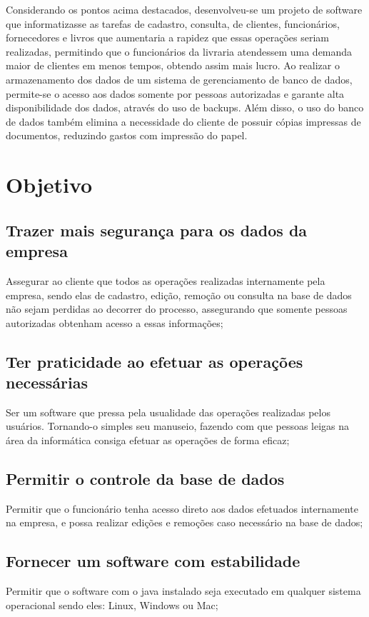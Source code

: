 Considerando os pontos acima destacados, desenvolveu-se um projeto de software que informatizasse as tarefas de cadastro, consulta, de clientes, funcionários, fornecedores e livros que aumentaria a rapidez que essas operações seriam realizadas, permitindo que o funcionários da livraria atendessem uma demanda maior de clientes em menos tempos, obtendo assim mais lucro. Ao realizar o armazenamento dos dados de um sistema de gerenciamento de banco de dados, permite-se o acesso aos dados somente por pessoas autorizadas e garante alta disponibilidade dos dados, através do uso de backups. Além disso, o uso do banco de dados também elimina a necessidade do cliente de possuir cópias impressas de documentos, reduzindo gastos com impressão do papel.


\section{Objetivo}
	

\subsection {Trazer mais segurança para os dados da empresa}
Assegurar ao cliente que todos as operações realizadas internamente pela empresa, sendo elas de cadastro, edição, remoção ou consulta na base de dados não sejam  perdidas ao decorrer do processo, assegurando que somente pessoas autorizadas obtenham acesso a essas informações;

\subsection{Ter praticidade ao efetuar as operações necessárias}
Ser um software que pressa pela usualidade das operações realizadas pelos usuários. Tornando-o simples seu manuseio, fazendo com que pessoas leigas na área da informática consiga efetuar as operações de forma eficaz; 

\subsection{Permitir o controle da base de dados}
Permitir que o funcionário tenha acesso direto aos dados efetuados internamente na empresa, e possa realizar edições e remoções caso necessário na base de dados;

\subsection{Fornecer um software com estabilidade}
Permitir que o software com o java instalado seja executado em qualquer sistema operacional sendo eles: Linux, Windows ou Mac;
	


